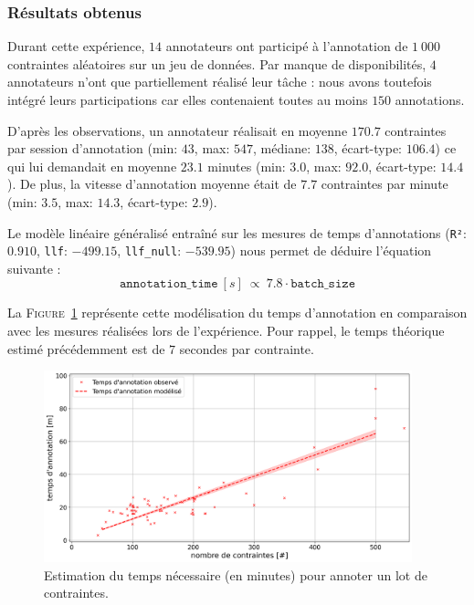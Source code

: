 		\subsubsection{Résultats obtenus}			
		
			Durant cette expérience, $14$ annotateurs ont participé à l'annotation de $1~000$ contraintes aléatoires sur un jeu de données.
			Par manque de disponibilités, $4$ annotateurs n'ont que partiellement réalisé leur tâche : nous avons toutefois intégré leurs participations car elles contenaient toutes au moins $150$ annotations.
			
			D'après les observations, un annotateur réalisait en moyenne $170.7$ contraintes par session d'annotation (min: $43$, max: $547$, médiane: $138$, écart-type: $106.4$) ce qui lui demandait en moyenne $23.1$ minutes (min: $3.0$, max: $92.0$, écart-type: $14.4$).
			De plus, la vitesse d'annotation moyenne était de $7.7$ contraintes par minute (min: $3.5$, max: $14.3$, écart-type: $2.9$).
			
			Le modèle linéaire généralisé entraîné sur les mesures de temps d'annotations (\texttt{R²}: $0.910$, \texttt{llf}: $-499.15$, \texttt{llf\_null}: $-539.95$) nous permet de déduire l'équation suivante :
			\begin{equation}
				\label{equation:4.3.1-ETUDE-COUT-COUTS-TEMPS-ANNOTATION}
				\texttt{annotation\_time}~[s]~
				\propto~7.8 \cdot \texttt{batch\_size}
			\end{equation}
		
			La \textsc{Figure~\ref{figure:4.3.1-ETUDE-COUTS-TEMPS-ANNOTATION-SIMULATION}} représente cette modélisation du temps d'annotation en comparaison avec les mesures réalisées lors de l'expérience.
			Pour rappel, le temps théorique estimé précédemment est de $7$ secondes par contrainte.
			\begin{figure}[!htb]
				\centering
				\includegraphics[width=0.95\textwidth]{figures/etude-temps-annotation-1-modelisation-temps}
				\caption{
					Estimation du temps nécessaire (en minutes) pour annoter un lot de contraintes.
				}
				\label{figure:4.3.1-ETUDE-COUTS-TEMPS-ANNOTATION-SIMULATION}
			\end{figure}
		
